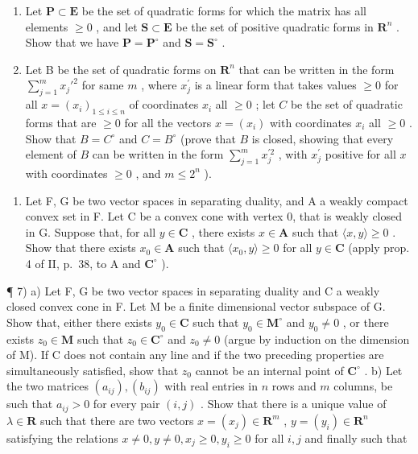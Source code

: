 \begin{enumerate}
\def\labelenumi{\alph{enumi})}
\item
  Let \(\mathbf{P} \subset \mathbf{E}\) be the set of quadratic forms for which the matrix has all elements \(\geqslant 0\) , and let \(\mathbf{S} \subset \mathbf{E}\) be the set of positive quadratic forms in \(\mathbf{R}^n\) . Show that we have \(\mathbf{P} = \mathbf{P}^\circ\) and \(\mathbf{S} = \mathbf{S}^\circ\) .
\item
  Let B be the set of quadratic forms on \(\mathbf{R}^n\) that can be written in the form \(\sum_{j=1}^{m} x_j'^2\) for same \(m\) , where \(x_{j}^{\prime}\) is a linear form that takes values \(\geqslant 0\) for all \(x = (x_{i})_{1\leqslant i\leqslant n}\) of coordinates \(x_{i}\) all \(\geqslant 0\) ; let \(C\) be the set of quadratic forms that are \(\geqslant 0\) for all the vectors \(x = (x_{i})\) with coordinates \(x_{i}\) all \(\geqslant 0\) . Show that \(B = C^{\circ}\) and \(C = B^{\circ}\) (prove that \(B\) is closed, showing that every element of \(B\) can be written in the form \(\sum_{j=1}^{m} x_{j}^{\prime 2}\) , with \(x_{j}^{\prime}\) positive for all \(x\) with coordinates \(\geqslant 0\) , and \(m \leqslant 2^{n}\) ).
\end{enumerate}

\begin{enumerate}
\def\labelenumi{\arabic{enumi})}
\setcounter{enumi}{5}
\tightlist
\item
  Let F, G be two vector spaces in separating duality, and A a weakly compact convex set in F. Let C be a convex cone with vertex 0, that is weakly closed in G. Suppose that, for all \(y \in \mathbf{C}\) , there exists \(x \in \mathbf{A}\) such that \(\langle x, y \rangle \geqslant 0\) . Show that there exists \(x_0 \in \mathbf{A}\) such that \(\langle x_0, y \rangle \geqslant 0\) for all \(y \in \mathbf{C}\) (apply prop. 4 of II, p.~38, to A and \(\mathbf{C}^\circ\) ).
\end{enumerate}

¶ 7) a) Let F, G be two vector spaces in separating duality and C a weakly closed convex cone in F. Let M be a finite dimensional vector subspace of G. Show that, either there exists \(y_0 \in \mathbf{C}\) such that \(y_0 \in \mathbf{M}^\circ\) and \(y_0 \neq 0\) , or there exists \(z_0 \in \mathbf{M}\) such that \(z_0 \in \mathbf{C}^\circ\) and \(z_0 \neq 0\) (argue by induction on the dimension of M). If C does not contain any line and if the two preceding properties are simultaneously satisfied, show that \(z_0\) cannot be an internal point of \(\mathbf{C}^\circ\) . b) Let the two matrices \((a_{ij}), (b_{ij})\) with real entries in \(n\) rows and \(m\) columns, be such that \(a_{ij} > 0\) for every pair \((i,j)\) . Show that there is a unique value of \(\lambda \in \mathbf{R}\) such that there are two vectors \(x = (x_j) \in \mathbf{R}^m\) , \(y = (y_i) \in \mathbf{R}^n\) satisfying the relations \(x \neq 0, y \neq 0, x_j \geqslant 0, y_i \geqslant 0\) for all \(i,j\) and finally such that

